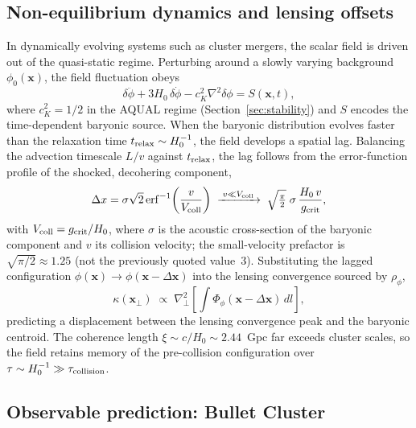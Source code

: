 \documentclass[11pt,a4paper]{article}
\begin{document}
\subsection{Non-equilibrium dynamics and lensing offsets}
\label{subsec:nonequilibrium}

In dynamically evolving systems such as cluster mergers, the scalar field is driven
out of the quasi-static regime. Perturbing around a slowly varying background
$\phi_0(\mathbf{x})$, the field fluctuation obeys
\begin{equation}
  \delta\ddot{\phi} + 3H_0\,\delta\dot{\phi} - c_K^2\nabla^2\delta\phi
  = S(\mathbf{x},t),
\end{equation}
where $c_K^2 = 1/2$ in the AQUAL regime (Section~\ref{sec:stability}) and $S$
encodes the time-dependent baryonic source. When the baryonic distribution evolves
faster than the relaxation time $t_{\rm relax}\sim H_0^{-1}$, the field
develops a spatial lag. Balancing the advection timescale $L/v$ against $t_{\rm relax}$, the lag follows from the
error-function profile of the shocked, decohering component,
\begin{equation}
  \Delta x = \sigma\sqrt{2}\,\mathrm{erf}^{-1}\!\left(\frac{v}{V_{\rm coll}}\right)
  \;\xrightarrow{\;v\ll V_{\rm coll}\;}\;
  \sqrt{\tfrac{\pi}{2}}\;\sigma\,\frac{H_0\,v}{g_{\rm crit}},
  \label{eq:lag}
\end{equation}
with $V_{\rm coll} = g_{\rm crit}/H_0$, where $\sigma$ is the acoustic cross-section of the
baryonic component and $v$ its collision velocity; the small-velocity prefactor is
$\sqrt{\pi/2}\approx1.25$ (not the previously quoted value~$3$). Substituting the lagged configuration $\phi(\mathbf{x})\to\phi(\mathbf{x}-\Delta\mathbf{x})$
into the lensing convergence sourced by $\rho_\phi$,
\begin{equation}
  \boxed{\kappa(\mathbf{x}_\perp) \;\propto\;
  \nabla_\perp^2\!\left[\int\Phi_\phi(\mathbf{x}-\Delta\mathbf{x})\,dl\right],}
  \label{eq:kappa_lag}
\end{equation}
predicting a displacement between the lensing convergence peak and the baryonic
centroid. The coherence length $\xi\sim c/H_0\sim2.44$~Gpc far exceeds cluster
scales, so the field retains memory of the pre-collision configuration over
$\tau\sim H_0^{-1}\gg\tau_{\rm collision}$.

\subsection{Observable prediction: Bullet Cluster}
\label{subsec:bullet}
\end{document}
